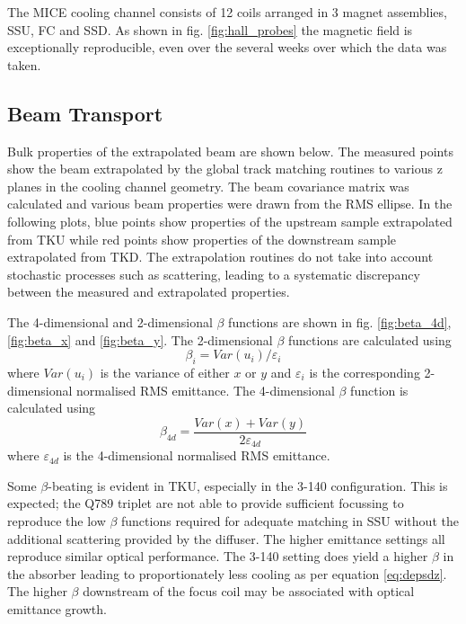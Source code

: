 The MICE cooling channel consists of 12 coils arranged in 3 magnet assemblies, 
SSU, FC and SSD. As shown in fig. \ref{fig:hall_probes} the magnetic field 
is exceptionally reproducible, even over the several weeks over which the data
was taken.

\subsection{Beam Transport}

Bulk properties of the extrapolated beam are shown below. The measured points
show the beam extrapolated by the global track matching routines to various
z planes in the cooling channel geometry. The beam covariance matrix was 
calculated and various beam properties were drawn from the RMS ellipse. In the
following plots, blue points show properties of the upstream sample extrapolated from TKU
while red points show properties of the downstream sample extrapolated from TKD. The
extrapolation routines do not take into account stochastic processes such as
scattering, leading to a systematic discrepancy between the measured and 
extrapolated properties.

The 4-dimensional and 2-dimensional $\beta$ functions are shown in fig. 
\ref{fig:beta_4d}, \ref{fig:beta_x} and \ref{fig:beta_y}. The 2-dimensional 
$\beta$ functions are calculated using
\begin{equation}
\beta_{i} = Var(u_i) / \varepsilon_i
\end{equation}
where $Var(u_i)$ is the variance of either $x$ or $y$ and $\varepsilon_i$ is 
the corresponding 2-dimensional normalised RMS emittance. The 4-dimensional 
$\beta$ function is calculated using
\begin{equation}
\beta_{4d} = \frac{Var(x)+Var(y)}{2\varepsilon_{4d}}
\end{equation}
where $\varepsilon_{4d}$ is the 4-dimensional normalised RMS emittance.

Some $\beta$-beating is evident in TKU, especially in the 3-140 configuration.
This is expected; the Q789 triplet are not able to provide sufficient focussing
to reproduce the low $\beta$ functions required for adequate matching in SSU
without the additional scattering provided by the diffuser. The higher emittance
settings all reproduce similar optical performance. The 3-140 setting does 
yield a higher $\beta$ in the absorber leading to proportionately less cooling 
as per equation \ref{eq:depsdz}. The higher $\beta$ downstream of the focus
coil may be associated with optical emittance growth.

